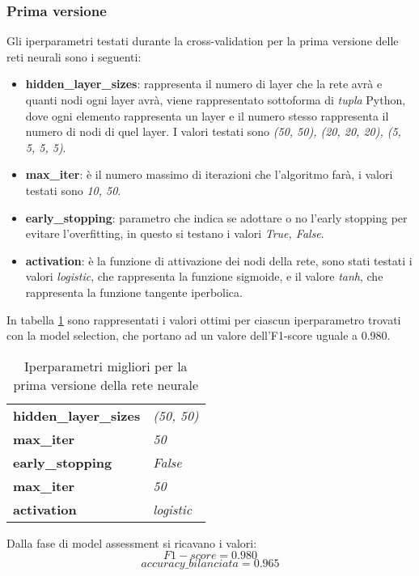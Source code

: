 \subsubsection{Prima versione}\label{nnv1}
Gli iperparametri testati durante la cross-validation per la prima versione delle reti neurali sono i seguenti:
\begin{itemize}
\item \textbf{hidden\_layer\_sizes}: rappresenta il numero di layer che la rete avrà e quanti nodi ogni layer avrà, viene rappresentato sottoforma di \textit{tupla} Python, dove ogni elemento rappresenta un layer e il numero stesso rappresenta il numero di nodi di quel layer. I valori testati sono \textit{(50, 50), (20, 20, 20), (5, 5, 5, 5)}.
\item \textbf{max\_iter}: è il numero massimo di iterazioni che l'algoritmo farà, i valori testati sono \textit{10, 50}.
\item \textbf{early\_stopping}: parametro che indica se adottare o no l'early stopping per evitare l'overfitting, in questo si testano i valori \textit{True, False}.
\item \textbf{activation}: è la funzione di attivazione dei nodi della rete, sono stati testati i valori \textit{logistic}, che rappresenta la funzione sigmoide, e il valore \textit{tanh}, che rappresenta la funzione tangente iperbolica.
\end{itemize}

In tabella \ref{tab:nnv1} sono rappresentati i valori ottimi per ciascun iperparametro trovati con la model selection, che portano ad un valore dell'F1-score uguale a 0.980.

\begin{table}[h] 
\centering
\begin{tabular}{l l}
\hline
\textbf{hidden\_layer\_sizes} & \textit{(50, 50)}\\
\textbf{max\_iter} & \textit{50}\\
\textbf{early\_stopping} & \textit{False}\\
\textbf{max\_iter} & \textit{50}\\
\textbf{activation} & \textit{logistic}\\
\hline
\end{tabular}
\caption{Iperparametri migliori per la prima versione della rete neurale}
\label{tab:nnv1}
\end{table}

Dalla fase di model assessment si ricavano i valori:
$$F1-score = 0.980$$
$$accuracy\_bilanciata = 0.965$$


